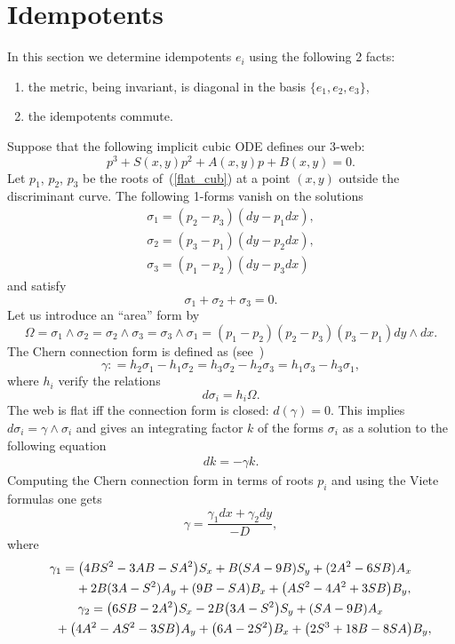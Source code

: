 \documentclass[pdftex]{sigma}
\begin{document}
\section{Idempotents}
In this section we determine idempotents $e_i$ using the following 2 facts:
\begin{enumerate}\itemsep=0pt
\item[1)] the metric, being invariant, is diagonal in the basis $\{e_1,e_2,e_3\}$,
\item[2)] the idempotents commute.
\end{enumerate}
Suppose that the following implicit cubic ODE def\/ines our $3$-web:
\begin{equation}\label{flat_cub}
p^3+S(x,y)p^2+A(x,y)p+B(x,y)=0.
\end{equation}
Let $p_1$, $p_2$, $p_3$ be the roots of~(\ref{flat_cub}) at a point
$(x,y)$ outside the discriminant curve. The following 1-forms vanish on the
solutions
\begin{gather}
\sigma_1=(p_2-p_3)(dy-p_1dx),\nonumber\\
\sigma_2=(p_3-p_1)(dy-p_2dx),\nonumber\\
\sigma_3=(p_1-p_2)(dy-p_3dx)\label{normalized forms}
\end{gather}
and satisfy
\[
\sigma_1+\sigma_2 + \sigma_3=0.
\]
Let us introduce an ``area'' form by
\[
\Omega =\sigma_1\wedge
\sigma_2=\sigma_2\wedge \sigma_3=\sigma_3\wedge
\sigma_1=(p_1-p_2)(p_2-p_3)(p_3-p_1)dy\wedge dx.
\]
 The Chern
connection form is def\/ined as (see~\cite{Be})
\[
\gamma:
=h_2\sigma_1-h_1\sigma_2=h_3\sigma_2-h_2\sigma_3=h_1\sigma_3-h_3\sigma_1,
\]
where $h_i$ verify the relations
\[
d\sigma_i=h_i\Omega.
\]
The web is f\/lat if\/f the connection form
is closed: $d(\gamma)=0$. This implies $d\sigma_i=\gamma \wedge \sigma_i$ and gives an integrating factor $k$ of the forms $\sigma_i$ as a solution to the following equation
\begin{gather*}%
dk=-\gamma k.
\end{gather*}
Computing the Chern connection form in terms of roots $p_i$ and using the Viete formulas one gets
\[
\gamma =\frac{\gamma_1dx+\gamma_2dy}{-D},
\]
where
\begin{gather*}
\gamma_1=\big(4BS^2-3AB-SA^2\big)S_x+B(SA-9B)S_y+(2A^2-6SB)A_x\nonumber\\
\hphantom{\gamma_1=}{}
+2B(3A-S^2)A_y+(9B-SA)B_x+\big(AS^2-4A^2+3SB\big)B_y,\nonumber\\
\gamma_2=\big(6SB-2A^2\big)S_x-2B\big(3A-S^2\big)S_y+(SA-9B)A_x\nonumber\\
\hphantom{\gamma_2=}{}
 + \big(4A^2-AS^2-3SB\big)A_y+\big(6A-2S^2\big)B_x+\big(2S^3+18B-8SA\big)B_y,%
\end{gather*}
\end{document}
